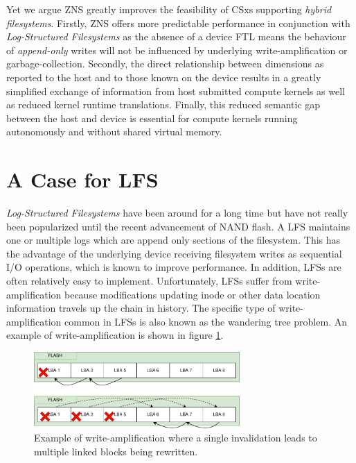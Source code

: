 Yet we argue ZNS greatly improves the feasibility of CSxs supporting
\textit{hybrid filesystems}. Firstly, ZNS offers more predictable performance in
conjunction with \textit{Log-Structured Filesystems} as the absence of a device
FTL means the behaviour of \textit{append-only} writes will not be influenced by
underlying write-amplification or garbage-collection. Secondly, the direct
relationship between dimensions as reported to the host and to those known on
the device results in a greatly simplified exchange of information from host
submitted compute kernels as well as reduced kernel runtime translations.
Finally, this reduced semantic gap between the host and device is essential for
compute kernels running autonomously and without shared virtual memory.

\section{A Case for LFS}

\label{lfscase}

\textit{Log-Structured Filesystems} have been around for a long
time \cite{Rosenblum1992TheDA} but have not really been popularized until the
recent advancement of NAND flash. A LFS maintains one or multiple logs which
are append only sections of the filesystem. This has the advantage of the
underlying device receiving filesystem writes as sequential I/O operations,
which is known to improve performance. In addition, LFSs are often relatively
easy to implement. Unfortunately, LFSs suffer from write-amplification because
modifications updating inode or other data location information travels up the
chain in history. The specific type of write-amplification common in LFSs is
also known as the wandering tree problem. An example of write-amplification is
shown in figure \ref{figure:writeamplification}.

\begin{figure}
    \centering
	\includegraphics[width=0.7\textwidth]{resources/images/write-amplification.pdf}
	\caption{Example of write-amplification where a single invalidation leads
    to multiple linked blocks being rewritten.}
    \label{figure:writeamplification}
\end{figure}

